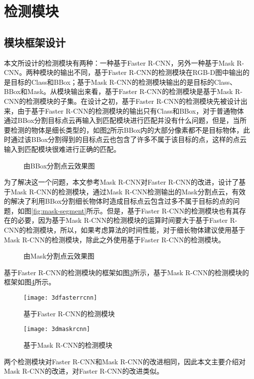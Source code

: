 \section{检测模块}
\label{sec:detector}
\subsection{模块框架设计}
本文所设计的检测模块有两种：一种基于Faster R-CNN，另外一种基于Mask R-CNN。两种模块的输出不同，基于Faster R-CNN的检测模块在RGB-D图中输出的是目标的Class和BBox；基于Mask R-CNN的检测模块输出的是目标的Class、BBox和Mask。从模块输出来看，基于Faster R-CNN的检测模块是基于Mask R-CNN的检测模块的子集。在设计之初，基于Faster R-CNN的检测模块先被设计出来，由于基于Faster R-CNN的检测模块的输出只有Class和BBox，对于普通物体通过BBox分割目标点云再输入到匹配模块进行匹配并没有什么问题，但是，当所要检测的物体是细长类型的，如图\ref{fig:bbox-segment}所示BBox内的大部分像素都不是目标物体，此时通过该BBox分割得到的目标点云也包含了许多不属于该目标的点，这样的点云输入到匹配模块很难进行正确的匹配。
\begin{figure}[ht]
  \centering
  \hskip1cm
  \subfloat[根据BBox分割得到的点云]{
  }
  \caption{由BBox分割点云效果图}
  \label{fig:bbox-segment}
\end{figure}

为了解决这一个问题，本文参考Mask R-CNN对Faster R-CNN的改进，设计了基于Mask R-CNN的检测模块，通过Mask R-CNN检测输出的Mask分割点云，有效的解决了利用BBox分割细长物体时造成目标点云包含过多不属于目标的点的问题，如图\ref{fig:mask-segment}所示。但是，基于Faster R-CNN的检测模块也有其存在的必要，因为基于Mask R-CNN的检测模块的运算时间要大于基于Faster R-CNN的检测模块，所以，如果考虑算法的时间性能，对于细长物体建议使用基于Mask R-CNN的检测模块，除此之外使用基于Faster R-CNN的检测模块。
\begin{figure}[ht]
  \centering
  \hskip1cm
  \subfloat[根据Mask分割得到的点云]{
  }
  \caption{由Mask分割点云效果图}
  \label{fig:bbox-segment}
\end{figure}

基于Faster R-CNN的检测模块的框架如图\ref{fig:3d_faster_rcnn}所示，基于Mask R-CNN的检测模块的框架如图\ref{fig:3d_mask_rcnn}所示。
\begin{figure}[ht]
  \centering
  \texttt{[image: 3dfasterrcnn]}
  \caption{基于Faster R-CNN的检测模块}
  \label{fig:3d_faster_rcnn}
\end{figure}
\begin{figure}[ht]
  \centering
  \texttt{[image: 3dmaskrcnn]}
  \caption{基于Mask R-CNN的检测模块}
  \label{fig:3d_mask_rcnn}
\end{figure}
两个检测模块对Faster R-CNN和Mask R-CNN的改进相同，因此本文主要介绍对Mask R-CNN的改进，对Faster R-CNN的改进类似。


